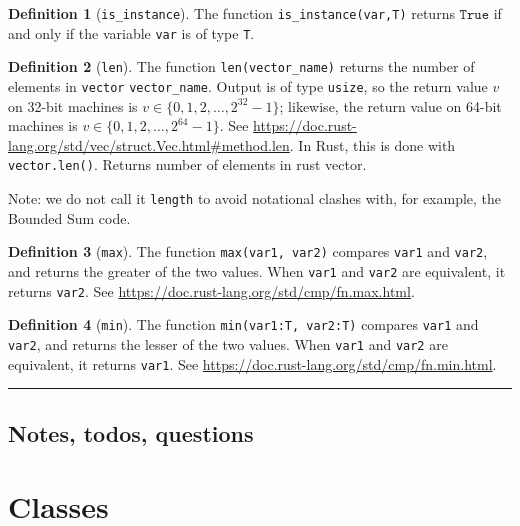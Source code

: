 \documentclass[11pt,a4paper]{article}
\theoremstyle{definition}
\newtheorem{definition}{Definition}[section]
\newcommand{\True}{\texttt{True}}
\newcommand{\horizline}{\noindent\rule{\textwidth}{1pt}}
\newcommand{\silvia}[1]{{ {\color{blue}{(silvia)~#1}}}}
\newcommand{\inRust}[2]{See \url{#2}.}
\begin{document}
\begin{definition}[\texttt{is\_instance}]
    The function \texttt{is\_instance(var,T)} returns $\True$ if and only if the variable \texttt{var} is of type \texttt{T}.
\end{definition}

\begin{definition}[\texttt{len}]
    The function \texttt{len(vector\_name)} returns the number of elements in \texttt{vector} \texttt{vector\_name}. Output is of type \texttt{usize}, so the return value $v$ on 32-bit machines is $v\in \{0,1,2,\ldots,2^{32} - 1\}$; likewise, the return value on 64-bit machines is $v\in \{0,1,2,\ldots,2^{64} - 1\}$. \inRust{std::vec::Vec::len}{https://doc.rust-lang.org/std/vec/struct.Vec.html\#method.len} In Rust, this is done with \texttt{vector.len()}. Returns number of elements in rust vector. \silvia{Why are there two different Rust names? Did you mean Python for the second?}
\end{definition}

Note: we do not call it \texttt{length} to avoid notational clashes with, for example, the Bounded Sum code.

\begin{definition}[\texttt{max}]
    The function \texttt{max(var1, var2)} compares \texttt{var1} and \texttt{var2}, and returns the greater of the two values. When \texttt{var1} and \texttt{var2} are equivalent, it returns \texttt{var2}. \inRust{std::cmp::max}{https://doc.rust-lang.org/std/cmp/fn.max.html}
\end{definition}

\begin{definition}[\texttt{min}]
    The function \texttt{min(var1:T, var2:T)} compares \texttt{var1} and \texttt{var2}, and returns the lesser of the two values. When \texttt{var1} and \texttt{var2} are equivalent, it returns \texttt{var1}. \inRust{std::cmp::min}{https://doc.rust-lang.org/std/cmp/fn.min.html}
\end{definition}

\horizline

\subsection{Notes, todos, questions}

\section{Classes}
\end{document}
